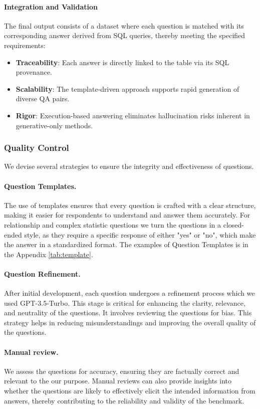\paragraph{Integration and Validation}
The final output consists of a dataset where each question is matched with its corresponding answer derived from SQL queries, thereby meeting the specified requirements:
\begin{itemize}
\item {\textbf{Traceability}}: Each answer is directly linked to the table via its SQL provenance.   
\item {\textbf{Scalability}}: The template-driven approach supports rapid generation of diverse QA pairs.
\item {\textbf{Rigor}}: Execution-based answering eliminates hallucination risks inherent in generative-only methods.
\end{itemize}

\subsubsection{Quality Control} 
We devise several strategies to ensure the integrity and effectiveness of questions.

\paragraph{Question Templates.}
The use of templates ensures that every question is crafted with a clear structure, making it easier for respondents to understand and answer them accurately. For relationship and complex statistic questions we turn the questions in a closed-ended style, as they require a specific response of either "yes" or "no", which make the answer in a standardized format. The examples of Question Templates is in the Appendix \ref{tab:template}. 

\paragraph{Question Refinement.} After initial development, each question undergoes a refinement process which we used GPT-3.5-Turbo. This stage is critical for enhancing the clarity, relevance, and neutrality of the questions. It involves reviewing the questions for bias. This strategy helps in reducing misunderstandings and improving the overall quality of the questions.

\paragraph{Manual review.} We assess the questions for accuracy, ensuring they are factually correct and relevant to the our purpose. Manual reviews can also provide insights into whether the questions are likely to effectively elicit the intended information from answers, thereby contributing to the reliability and validity of the benchmark.
   
